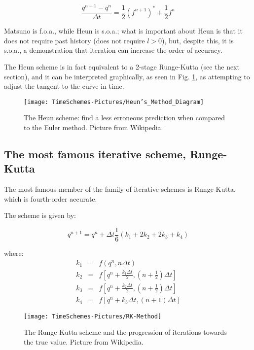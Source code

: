 \begin{equation}
	\frac{q^{n+1}-q^{n}}{\Delta t} = \frac{1}{2} \left(f^{n+1}\right)^* + \frac{1}{2} f^n
	\label{Heun}
\end{equation}

Matsuno is f.o.a., while Heun is s.o.a.; what is important about Heun is that it does not require past history (does not require $l>0$), but, despite this, it is s.o.a., a demonstration that iteration can increase the order of accuracy.

The Heun scheme is in fact equivalent to a 2-stage Runge-Kutta (see the next section), and it can be interpreted graphically, as seen in Fig. \ref{Fig:Heun}, as attempting to adjust the tangent to the curve in time.

\begin{figure}[h!]
	\texttt{[image: TimeSchemes-Pictures/Heun's\_Method\_Diagram]}
	\caption{The Heun scheme: find a less erroneous prediction when compared to the Euler method. Picture from Wikipedia.}
	\label{Fig:Heun}
\end{figure}

\newpage

\subsection{The most famous iterative scheme, Runge-Kutta}
The most famous member of the family of iterative schemes is Runge-Kutta, which is fourth-order accurate.

The scheme is given by:

\begin{equation}
	q^{n+1} = q^n + {\Delta t} \frac{1}{6} \left( k_1 + 2 k_2 + 2 k_3 + k_4 \right)
	\label{Runge-Kutta}
\end{equation}

where:
\begin{eqnarray*}
	k_1 &=& f \left( q^n, n \Delta t\right)\\
	k_2 &=&  f \left[ q^n +\frac{k_1 \Delta t }{2} , \left( n + \frac{1}{2}  \right) \Delta t \right]\\
	k_3 &=& f \left[ q^n +\frac{k_2 \Delta t }{2} , \left( n + \frac{1}{2}  \right) \Delta t \right]\\
	k_4 &=& f \left[ q^n +k_3 \Delta t , \left( n + 1  \right) \Delta t \right]
	\label{Runge-Kutta-ks}
\end{eqnarray*}

\begin{figure}[h!]
	\texttt{[image: TimeSchemes-Pictures/RK-Method]}
	\caption{The Runge-Kutta scheme and the progression of iterations towards the true value. Picture from Wikipedia.}
	\label{Fig:RK}
\end{figure}

